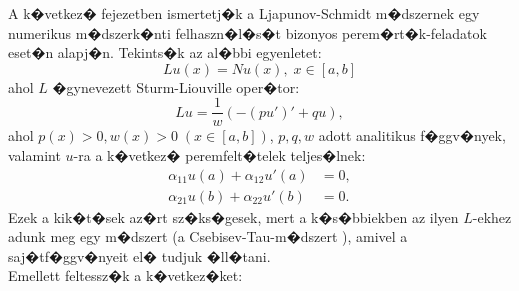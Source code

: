 




\label{chap:LjapunovSchmidtNum}

A k�vetkez� fejezetben ismertetj�k a Ljapunov-Schmidt m�dszernek egy numerikus m�dszerk�nti felhaszn�l�s�t bizonyos perem�rt�k-feladatok eset�n \cite{LSNum} alapj�n. %
Tekints�k az al�bbi egyenletet:
\begin{equation}
Lu(x) = Nu(x),\;x\in[a, b] \label{eq:num:1}
\end{equation}
ahol $L$ �gynevezett Sturm-Liouville oper�tor:
\begin{equation*}
L u = \frac{1}{w} ( -(p u')' + q u),
\end{equation*}
ahol $p(x) > 0, w(x) > 0\;(x \in [a, b])$, $p, q, w$ adott analitikus f�ggv�nyek, valamint $u$-ra a k�vetkez� peremfelt�telek teljes�lnek:
\begin{align*}
\alpha_{11}u(a) + \alpha_{12}u'(a) &= 0, \\
\alpha_{21}u(b) + \alpha_{22}u'(b) &= 0.
\end{align*}
Ezek a kik�t�sek az�rt sz�ks�gesek, mert a k�s�bbiekben az ilyen $L$-ekhez adunk meg egy m�dszert (a Csebisev-Tau-m�dszert \cite{ChebysevTau}), amivel a saj�tf�ggv�nyeit el� tudjuk �ll�tani. \\ %
Emellett feltessz�k a k�vetkez�ket:
